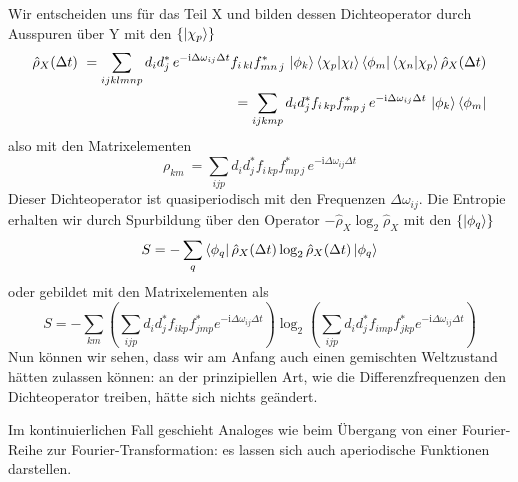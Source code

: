 \documentclass[12pt]{article}
\begin{document}
Wir entscheiden uns für das Teil X und bilden dessen Dichteoperator durch Ausspuren über Y mit den $\{\ket{\chi_p}\}$
\begin{equation}
\label{eq:rho_quasiperiodic}
\begin{split}
\hat{\rho}_X(\Delta t)
\ = \sum_{ijklmnp}d_{i}d_{j}^*\, e^{-\mathrm i \Delta\omega_{ij}\Delta t} 
f_{i\,kl}f_{mn\,j}^*\, \ket{\phi_k}\bra{\chi_p}\ket{\chi_l}\bra{\phi_m}\bra{\chi_n}\ket{\chi_p}
\hat{\rho}_X(\Delta t) 
\\
= \sum_{ijkmp}d_{i}d_{j}^* f_{i\,kp}f_{mp\,j}^*\, e^{-\mathrm i \Delta\omega_{ij}\Delta t} 
\, \ket{\phi_k}\bra{\phi_m} 
\end{split}
\end{equation}
also mit den Matrixelementen
\begin{equation}
\label{eq:rho_matrix_quasiperiodic}
\rho_{km}\ = \sum_{ijp}d_{i}d_{j}^* f_{i\,kp}f_{mp\,j}^*\, e^{-\mathrm i \Delta\omega_{ij}\Delta t} 
\end{equation}
Dieser Dichteoperator ist quasiperiodisch mit den Frequenzen $\Delta \omega_{ij}$. Die Entropie erhalten wir durch Spurbildung über den Operator $-\hat{\rho}_X \log_2 \hat{\rho}_X$ mit den $\{\ket{\phi_q}\}$
\begin{equation}
\label{eq:S_quasiperiodic}
S = -\sum_q \bra{\phi_q} \hat{\rho}_X(\Delta t) \log_2 \hat{\rho}_X(\Delta t)  \ket{\phi_q}
\end{equation}
oder gebildet mit den Matrixelementen als
\begin{equation}
\label{eq:S_matrix_quasiperiodic}
S = -\sum_{km}\left(\sum_{ijp}d_{i}d_{j}^* f_{ikp}f_{jmp}^* e^{-\mathrm i \Delta\omega_{ij}\Delta t}\right)
\log_2 \left(\sum_{ijp}d_{i}d_{j}^* f_{imp}f_{jkp}^* e^{-\mathrm i \Delta\omega_{ij}\Delta t}\right)
\end{equation}
Nun können wir sehen, dass wir am Anfang auch einen gemischten Weltzustand hätten zulassen können: an der prinzipiellen Art, wie die Differenzfrequenzen den Dichteoperator treiben, hätte sich nichts geändert.

Im kontinuierlichen Fall geschieht Analoges wie beim Übergang von einer Fourier-Reihe zur Fourier-Transformation: es lassen sich auch aperiodische Funktionen darstellen. 
\end{document}
